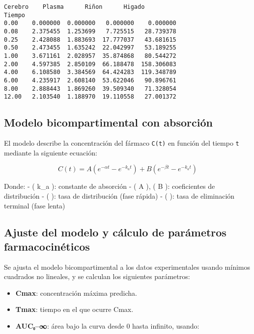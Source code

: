 \documentclass[11pt]{article}
\providecommand{\tightlist}{%
      \setlength{\itemsep}{0pt}\setlength{\parskip}{0pt}}
\begin{document}
    \begin{Verbatim}[commandchars=\\\{\}]
         Cerebro    Plasma      Riñon      Higado
Tiempo
0.00    0.000000  0.000000   0.000000    0.000000
0.08    2.375455  1.253699   7.725515   28.739378
0.25    2.428088  1.883693  17.777037   43.681615
0.50    2.473455  1.635242  22.042997   53.189255
1.00    3.671161  2.028957  35.874868   80.544272
2.00    4.597385  2.850109  66.188478  158.306083
4.00    6.108580  3.384569  64.424283  119.348789
6.00    4.235917  2.608140  53.622046   90.896761
8.00    2.888443  1.869260  39.509340   71.328054
12.00   2.103540  1.188970  19.110558   27.001372
    \end{Verbatim}

    \subsection{Modelo bicompartimental con
absorción}\label{modelo-bicompartimental-con-absorciuxf3n}

El modelo describe la concentración del fármaco \texttt{C(t)} en función
del tiempo \texttt{t} mediante la siguiente ecuación:

\[
C(t) = A \left(e^{-\alpha t} - e^{-k_a t} \right) + B \left(e^{-\beta t} - e^{-k_a t} \right)
\]

Donde: - ( k\_a ): constante de absorción - ( A ), ( B ): coeficientes
de distribución - ( \alpha ): tasa de distribución (fase rápida) - (
\beta ): tasa de eliminación terminal (fase lenta)

    \subsection{Ajuste del modelo y cálculo de parámetros
farmacocinéticos}\label{ajuste-del-modelo-y-cuxe1lculo-de-paruxe1metros-farmacocinuxe9ticos}

Se ajusta el modelo bicompartimental a los datos experimentales usando
mínimos cuadrados no lineales, y se calculan los siguientes parámetros:

\begin{itemize}
\tightlist
\item
  \textbf{Cmax}: concentración máxima predicha.
\item
  \textbf{Tmax}: tiempo en el que ocurre Cmax.
\item
  \textbf{AUC₀--∞}: área bajo la curva desde 0 hasta infinito, usando:
\end{itemize}
\end{document}
